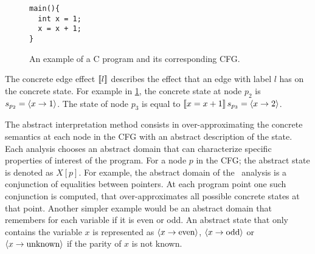 \begin{figure}\begin{minipage}{0.45\textwidth}

\begin{verbatim}
main(){
  int x = 1;
  x = x + 1;
}
\end{verbatim}

\end{minipage}
\begin{minipage}{0.45\textwidth}

\end{minipage}

  \caption{An example of a C program and its corresponding CFG.}
\label{fig:example-C-program}

\end{figure}

The concrete edge effect $\llbracket l\rrbracket$ describes the effect that an edge with label $l$ has on the concrete state.
For example in \cref{fig:example-C-program}, the concrete state at node $p_2$ is $s_{p_2} = \langle x \rightarrow 1\rangle$.
The state of node $p_3$ is equal to $\llbracket x = x+1\rrbracket\,s_{p_3} = \langle x \rightarrow 2\rangle$.

The abstract interpretation method consists in over-approximating the concrete semantics at each node in the CFG with an abstract description of the state.
Each analysis chooses an abstract domain that can characterize specific properties of interest of the program.
For a node $p$ in the CFG; the abstract state is denoted as $X[p]$.
For example, the abstract domain of the \cpo\ analysis is a conjunction of equalities between pointers.
At each program point one such conjunction is computed, that over-approximates all possible concrete states at that point.
Another simpler example would be an abstract domain that remembers for each variable if it is even or odd.
An abstract state that only contains the variable $x$ is represented as $\langle x \rightarrow \text{even}\rangle$, $\langle x \rightarrow \text{odd}\rangle$ or $\langle x \rightarrow \text{unknown}\rangle$ if the parity of $x$ is not known.


